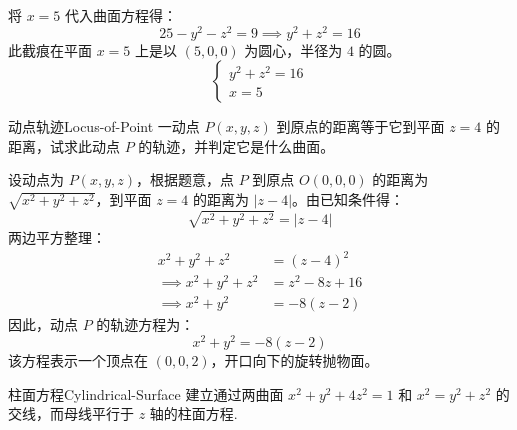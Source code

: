 \begin{solution}
    将 $x = 5$ 代入曲面方程得：
    \begin{equation*}
        25 - y^2 - z^2 = 9 \implies y^2 + z^2 = 16
    \end{equation*}
    此截痕在平面 $x = 5$ 上是以 $(5, 0, 0)$ 为圆心，半径为 $4$ 的圆。
    \begin{equation*}
        \boxed{\begin{cases} y^2 + z^2 = 16 \\ x = 5 \end{cases}}
    \end{equation*}
\end{solution}

\begin{problem}{动点轨迹}{Locus-of-Point}
    一动点 $P(x, y, z)$ 到原点的距离等于它到平面 $z = 4$ 的距离，试求此动点 $P$ 的轨迹，并判定它是什么曲面。
\end{problem}

\begin{solution}
    设动点为 $P(x, y, z)$，根据题意，点 $P$ 到原点 $O(0, 0, 0)$ 的距离为 $\sqrt{x^2 + y^2 + z^2}$，到平面 $z = 4$ 的距离为 $|z - 4|$。由已知条件得：
    \begin{equation*}
        \sqrt{x^2 + y^2 + z^2} = |z - 4|
    \end{equation*}
    两边平方整理：
    \begin{equation*}
        \begin{aligned}
            x^2 + y^2 + z^2          & = (z - 4)^2     \\
            \implies x^2 + y^2 + z^2 & = z^2 - 8z + 16 \\
            \implies x^2 + y^2       & = -8(z - 2)
        \end{aligned}
    \end{equation*}
    因此，动点 $P$ 的轨迹方程为：
    \begin{equation*}
        \boxed{x^2 + y^2 = -8(z - 2)}
    \end{equation*}
    该方程表示一个顶点在 $(0, 0, 2)$，开口向下的旋转抛物面。
\end{solution}


\begin{problem}{柱面方程}{Cylindrical-Surface}
    建立通过两曲面 $x^2 + y^2 + 4z^2 = 1$ 和 $x^2 = y^2 + z^2$ 的交线，而母线平行于 $z$ 轴的柱面方程.
\end{problem}

